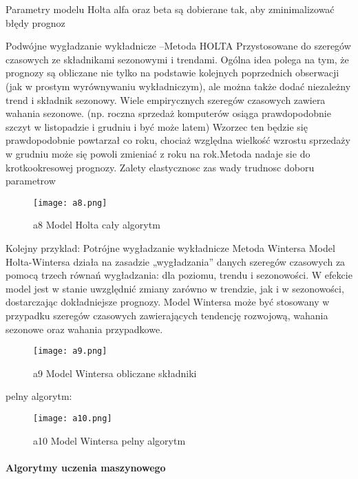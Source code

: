 Parametry modelu Holta alfa oraz beta są dobierane tak, aby zminimalizować błędy prognoz\cite{szos2012}

Podwójne wygładzanie wykładnicze –Metoda HOLTA Przystosowane do szeregów czasowych ze składnikami 
sezonowymi i trendami.  Ogólna idea polega na tym, że prognozy są obliczane nie tylko 
na podstawie kolejnych poprzednich obserwacji (jak w prostym  wyrównywaniu wykładniczym), ale można także dodać niezależny trend i składnik sezonowy. 
 Wiele empirycznych szeregów czasowych zawiera wahania 
sezonowe. (np. roczna sprzedaż komputerów osiąga prawdopodobnie szczyt w listopadzie i grudniu i być może latem) Wzorzec ten będzie się prawdopodobnie powtarzał co roku, chociaż względna wielkość wzrostu sprzedaży w grudniu może się powoli zmieniać z roku na rok.Metoda nadaje sie do krotkookresowej prognozy. Zalety elastycznosc zas  wady trudnosc doboru parametrow\cite{szer2009}

\begin{figure}[h!]
    \label{fig:a8}
    \centering \texttt{[image: a8.png]}
    \caption{a8 Model Holta  cały algorytm\cite{szer2009}}
\end{figure}


Kolejny przyklad: Potrójne wygładzanie wykładnicze Metoda Wintersa
Model Holta-Wintersa działa na zasadzie „wygładzania” danych szeregów czasowych za pomocą trzech równań wygładzania: dla poziomu, trendu i sezonowości. W efekcie model jest w stanie uwzględnić zmiany zarówno w trendzie, jak i w sezonowości, dostarczając dokładniejsze prognozy.\cite{exc2018}
Model Wintersa może być stosowany w przypadku szeregów czasowych zawierających tendencję rozwojową, wahania sezonowe oraz wahania przypadkowe. \cite{win2023}

\begin{figure}[h!]
    \label{fig:a9}
    \centering \texttt{[image: a9.png]}
    \caption{a9 Model Wintersa  obliczane składniki \cite{win2023}}
\end{figure}

pelny algorytm:

\begin{figure}[h!]
    \label{fig:a10}
    \centering \texttt{[image: a10.png]}
    \caption{a10 Model Wintersa  pelny algorytm \cite{szer2009}}
\end{figure}

\newpage

\paragraph{Algorytmy uczenia maszynowego}


